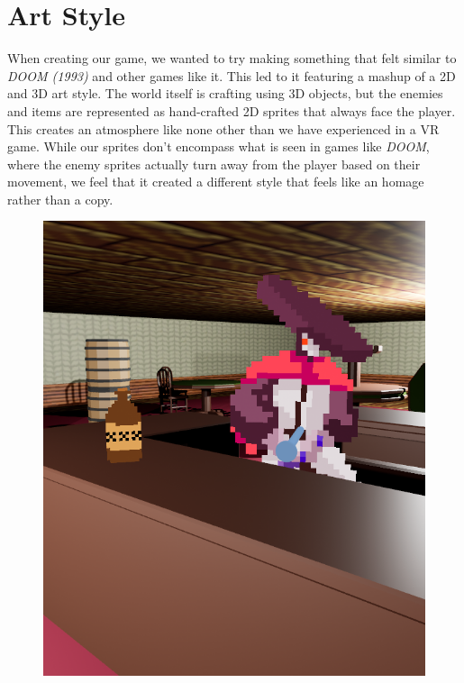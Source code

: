 \documentclass{sigchi}
\begin{document}
\section{Art Style}
When creating our game, we wanted to try making something that felt similar to \textit{DOOM (1993)} and other games like it. This led to it featuring a mashup of a 2D and 3D art style. The world itself is crafting using 3D objects, but the enemies and items are represented as hand-crafted 2D sprites that always face the player. This creates an atmosphere like none other than we have experienced in a VR game. While our sprites don’t encompass what is seen in games like \textit{DOOM}, where the enemy sprites actually turn away from the player based on their movement, we feel that it created a different style that feels like an homage rather than a copy.
\begin{figure}
	\centering
	\includegraphics[scale=0.4]{2D.png}
\end{figure}
\end{document}
